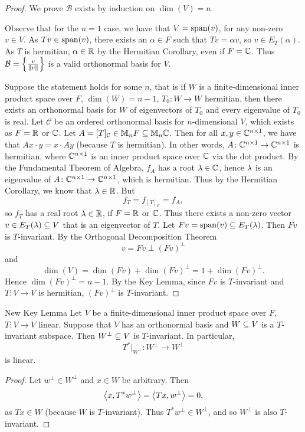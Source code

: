 \documentclass[class=article, crop=false]{standalone}
\begin{document}
  \begin{proof}
    We prove $\mathcal{B}$ exists by induction on $\dim(V) = n$. \par
    Observe that for the $n = 1$ case, we have that $V= \operatorname{span}(v)$, for any non-zero $v\in V$. As $Tv\in \operatorname{span}(v)$, there exists an $\alpha\in F$ such that $Tv = \alpha v$, so $v\in E_T(\alpha)$. As $T$ is hermitian, $\alpha\in \mathbb{R}$ by the Hermitian Corollary, even if $F = \mathbb{C}$. Thus $\mathcal{B} = \left\{\frac{v}{\left\lVert v\right\rVert}\right\}$ is a valid orthonormal basis for $V$. \par
    Suppose the statement holds for some $n$, that is if $W$ is a finite-dimensional inner product space over $F$, $\dim(W) = n-1$, $T_0\colon W\to W$ hermitian, then there exists an orthonormal basis for $W$ of eigenvectors of $T_0$ and every eigenvalue of $T_0$ is real. Let $\mathcal{C}$ be an ordered orthonormal basis for $n$-dimensional $V$, which exists as $F = \mathbb{R}$ or $\mathbb{C}$. Let $A = [T]_{\mathcal{C}}\in \mathbb{M}_nF\subseteq \mathbb{M}_n\mathbb{C}$. Then for all $x, y\in \mathbb{C}^{n\times 1}$, we have that $Ax\cdot y = x\cdot Ay$ (because $T$ is hermitian). In other words, $A\colon \mathbb{C}^{n\times 1}\to \mathbb{C}^{n\times 1}$ is hermitian, where $\mathbb{C}^{n\times 1}$ is an inner product space over $\mathbb{C}$ via the dot product. By the Fundamental Theorem of Algebra, $f_A$ has a root $\lambda\in \mathbb{C}$, hence $\lambda$ is an eigenvalue of $A\colon \mathbb{C}^{n\times 1}\to \mathbb{C}^{n\times 1}$, which is hermitian. Thus by the Hermitian Corollary, we know that $\lambda\in \mathbb{R}$. But
    \[
      f_T = f_{[T]_{\mathcal{C}}} = f_A,
    \]
    so $f_T$ has a real root $\lambda\in \mathbb{R}$, if $F = \mathbb{R}$ or $\mathbb{C}$. Thus there exists a non-zero vector $v\in E_T(\lambda)\subseteq V$ that is an eigenvector of $T$. Let $Fv = \operatorname{span}(v)\subseteq E_T(\lambda)$. Then $Fv$ is $T$-invariant. By the Orthogonal Decomposition Theorem
    \[
      v = Fv \perp (Fv)^\perp
    \]
    and
    \[
      \dim(V) = \dim(Fv) + \dim(Fv)^\perp = 1 + \dim(Fv)^\perp.
    \]
    Hence $\dim(Fv)^\perp = n - 1$. By the Key Lemma, since $Fv$ is $T$-invariant and $T\colon V\to V$ is hermitian, $(Fv)^\perp$ is $T$-invariant. 
  \end{proof}
  \newpage
  \begin{theorem}{New Key Lemma}
    Let $V$ be a finite-dimensional inner product space over $F$, $T\colon V\to V$ linear. Suppose that $V$ has an orthonormal basis and $W\subseteq V$ is a $T$-invariant subspace. Then $W^\perp\subseteq V$ is $T$-invariant. In particular,
    \[
      T^*|_{W^\perp}\colon W^\perp\to W^\perp
    \]
    is linear.
  \end{theorem}
  \begin{proof}
    Let $w^\perp\in W^\perp$ and $x\in W$ be arbitrary. Then
    \[
      \left\langle x, T^*w^\perp \right\rangle = \left\langle Tx, w^\perp \right\rangle = 0,
    \]
    as $Tx\in W$ (because $W$ is $T$-invariant). Thus $T^*w^\perp\in W^\perp$, and so $W^\perp$ is also $T$-invariant.
  \end{proof}
\end{document}
